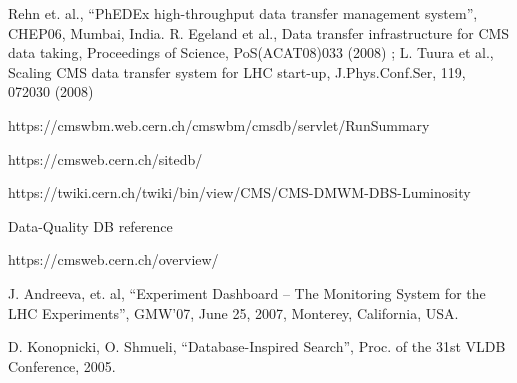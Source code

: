 \documentclass[a4paper]{jpconf}
\begin{document}
\begin{thebibliography}{9}
Rehn et. al.,
``PhEDEx high-throughput data transfer management system'', CHEP06, Mumbai, India.
R. Egeland et al., Data transfer infrastructure for CMS data taking, Proceedings of Science,
PoS(ACAT08)033 (2008) ;
L. Tuura et al., Scaling CMS data transfer system for LHC start-up, J.Phys.Conf.Ser, 119, 072030 (2008)

https://cmswbm.web.cern.ch/cmswbm/cmsdb/servlet/RunSummary

https://cmsweb.cern.ch/sitedb/

https://twiki.cern.ch/twiki/bin/view/CMS/CMS-DMWM-DBS-Luminosity

Data-Quality DB reference

https://cmsweb.cern.ch/overview/

J. Andreeva, et. al,
``Experiment Dashboard – The Monitoring System for the LHC Experiments'',
GMW’07, June 25, 2007, Monterey, California, USA.

D. Konopnicki, O. Shmueli,
``Database-Inspired Search'', 
Proc. of the 31st VLDB Conference, 2005.
\end{thebibliography}
\end{document}
